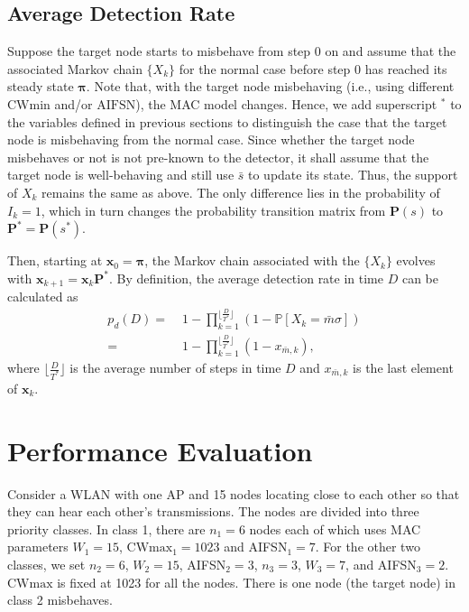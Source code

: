 \documentclass[conference]{IEEEtran}
\begin{document}
\subsection{Average Detection Rate}
Suppose the target node starts to misbehave from step $0$ on and assume that the associated Markov chain $\{X_k\}$ for the normal case before step $0$ has reached its steady state $\boldsymbol\pi$. Note that, with the target node misbehaving (i.e., using different $\textrm{CWmin}$ and/or $\textrm{AIFSN}$), the MAC model changes. Hence, we add superscript $^*$ to the variables defined in previous sections to distinguish the case that the target node is misbehaving from the normal case. Since whether the target node misbehaves or not is not pre-known to the detector, it shall assume that the target node is well-behaving and still use $\bar{s}$ to update its state. Thus, the support of $X_k$ remains the same as above. The only difference lies in the probability of $I_k=1$, which in turn changes the probability transition matrix from $\mathbf{P}(s)$ to $\mathbf{P}^*=\mathbf{P}(s^*)$.



Then, starting at ${{\boldsymbol{x}}}_0={\boldsymbol\pi}$, the Markov chain associated with the $\{X_k\}$ evolves with ${\boldsymbol{x}}_{k+1}={\boldsymbol{x}}_k{\mathbf{P}^*}$. By definition, the average detection rate in time $D$ can be calculated as
\begin{align}
\nonumber  p_d(D) =&\; 1-\prod^{\lfloor\frac{D}{{T}^*}\rfloor}_{k=1}\left(1-\mathbb{P}[X_{k}={\bar{m}}{{\sigma}}]\right)\\
           =&\; 1-\prod^{\lfloor\frac{D}{{T}^*}\rfloor}_{k=1}\left(1-x_{\bar{m},k}\right),
\end{align}
where $\lfloor\frac{D}{{T}^*}\rfloor$ is the average number of steps in time $D$ and $x_{\bar{m},k}$ is the last element of ${\boldsymbol{x}}_k$.


\section{Performance Evaluation}\label{sec:numerical}
Consider a WLAN with one AP and 15 nodes locating close to each other so that they can hear each other's transmissions. The nodes are divided into three priority classes. In class 1, there are $n_1=6$ nodes each of which uses MAC parameters $W_{1}=15$, $\textrm{CWmax}_{1}=1023$ and AIFSN$_1=7$. For the other two classes, we set $n_2=6$, $W_{2}=15$, AIFSN$_2=3$, $n_3=3$, $W_{3}=7$, and AIFSN$_3=2$. $\textrm{CWmax}$ is fixed at 1023 for all the nodes. There is one node (the target node) in class 2 misbehaves.
\end{document}

